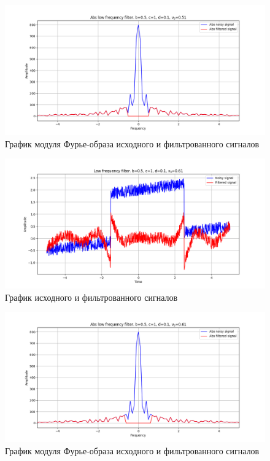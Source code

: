 \documentclass[a4paper, 12pt]{article}
\begin{document}
    \begin{figure}[!htb]
        \centering
        \includegraphics[scale=0.485]{5_abs_u_U_nolow.png}
        \captionsetup{skip=0pt}
        \caption{График модуля Фурье-образа исходного и фильтрованного сигналов}
        \label{fig:fig36}
    \end{figure}
    \begin{figure}[!htb]
        \centering
        \includegraphics[scale=0.485]{6_u_flt_u_nolow.png}
        \captionsetup{skip=0pt}
        \caption{График исходного и фильтрованного сигналов}
        \label{fig:fig37}
    \end{figure}
    \begin{figure}[!htb]
        \centering
        \includegraphics[scale=0.485]{6_abs_u_U_nolow.png}
        \captionsetup{skip=0pt}
        \caption{График модуля Фурье-образа исходного и фильтрованного сигналов}
        \label{fig:fig38}
    \end{figure}
\end{document}

